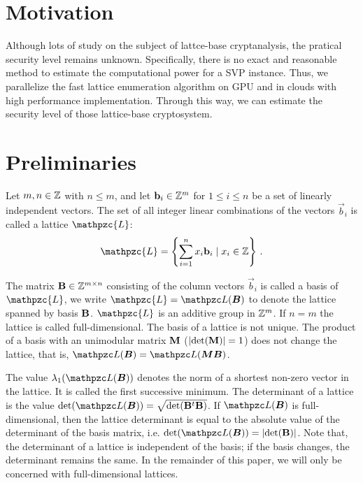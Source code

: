 \begin{CJK}{Bg5}{bsmi}
\section{Motivation}
Although lots of study on the subject of lattce-base cryptanalysis, the pratical security level remains unknown. Specifically, there is no exact and reasonable method to estimate the computational power for a SVP instance. Thus, we parallelize the fast lattice enumeration algorithm on GPU and in clouds with high performance implementation. Through this way, we can estimate the security level of those lattice-base cryptosystem.
\\


\section{Preliminaries}

Let $m,n \in \mathbb{Z}$ with $n\leq m$, and let $\mathbf{b}_{i} \in \mathbb{Z}^{m}$ for $1\leq i \leq n$ be a set of linearly independent vectors. The set of all integer linear combinations of the vectors $\vec{b}_{i}$ is called a lattice  $\mathpzc{L}$:
\begin{align*}
 \mathpzc{L} = \left\{ \sum_{i=1}^{n} x_{i} \vec{b}_{i} \; | \; x_{i} \in \ZZ \right\} \,.
\end{align*}

The matrix $\mathbf{B}\in \mathbb{Z}^{m\times n}$ consisting of the column vectors $\vec{b}_{i}$ is called a basis of  $\mathpzc{L}$, we write  $\mathpzc{L} = \latticeb{B}$ to denote the lattice spanned by basis $\mathbf{B}$.
 $\mathpzc{L}$ is an additive group in $\mathbb{Z}^{m}$. If $n=m$ the lattice is called full-dimensional.
The basis of a lattice is not unique. The product of a basis with an unimodular matrix $\mathbf{M}$ ($\left\lvert \det(\mathbf{M}) \right\rvert = 1$) does not change the lattice, that is,  $\latticeb{B} = \latticeb{MB}$.

The value $\lambda_{1}(\latticeb{B})$ denotes the norm of a shortest non-zero vector in the lattice. It is called the first successive minimum. The determinant of a lattice is the value $\det(\latticeb{B}) = \sqrt{\det(\mat{B}^{t}\mat{B})}$. If $\latticeb{B}$ is full-dimensional, then the lattice determinant is equal to the absolute value of the determinant of the basis matrix, i.e. $\det(\latticeb{B}) = \abs{\det(\mat{B})}$. Note that, the determinant of a lattice is independent of the basis; if the basis changes, the determinant remains the same. In the remainder of this paper, we will only be concerned with full-dimensional lattices.


\end{CJK}
